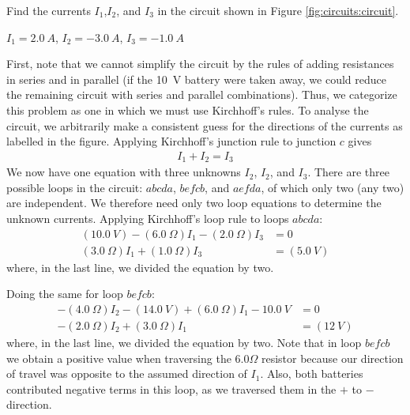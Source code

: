 \question Find the currents $I_{1}$,$I_{2}$, and $I_{3}$ in the circuit shown in Figure \ref{fig:circuits:circuit}.
\begin{finalanswer}
$I_1=\SI{2.0}{A}$, $I_2=\SI{-3.0}{A}$, $I_3=\SI{-1.0}{A}$
\end{finalanswer}
\begin{solution} 
First, note that we cannot simplify the circuit by the rules of adding resistances in series and in parallel (if the \SI{10}{V} battery were taken away, we could reduce the remaining circuit with series and parallel combinations). Thus, we categorize this problem as one in which we must use Kirchhoff’s rules. To analyse the circuit, we arbitrarily make a consistent guess for the directions of the currents as labelled in the figure. Applying Kirchhoff’s junction rule
to junction $c$ gives
\begin{align}
\label{eqn:j1}
I_1+I_2=I_3
\end{align}
We now have one equation with three unknowns $I_2$, $I_2$, and $I_3$. There are three possible loops in the circuit: $abcda$, $befcb$, and $aefda$, of which only two (any two) are independent. We therefore need only two loop equations to determine
the unknown currents.  Applying Kirchhoff’s loop rule to loops $abcda$:
\begin{align}
\label{eqn:l1}
(\SI{10.0}{V}) -(\SI{6.0}{\Omega}) I_1 - (\SI{2.0}{\Omega}) I_3&=0\nonumber\\
(\SI{3.0}{\Omega}) I_1 + (\SI{1.0}{\Omega}) I_3 &=(\SI{5.0}{V}) 
\end{align}
where, in the last line, we divided the equation by two.

Doing the same for loop $befcb$:
\begin{align}
\label{eqn:l2}
 -(\SI{4.0}{\Omega})I_2-(\SI{14.0}{V}) +(\SI{6.0}{\Omega})I_1-\SI{10.0}{V} &=0\nonumber\\
 -(\SI{2.0}{\Omega})I_2 +(\SI{3.0}{\Omega})I_1 &=(\SI{12}{V})
\end{align}
where, in the last line, we divided the equation by two. Note that in loop $befcb$ we obtain a positive value when traversing the $6.0\Omega$ resistor because our direction of travel was opposite to the assumed direction of $I_1$. Also, both batteries contributed negative terms in this loop, as we traversed them in the $+$ to $-$ direction.


\end{solution}
